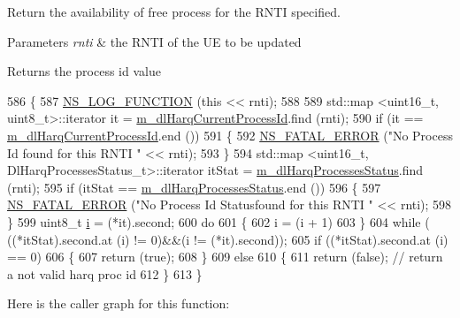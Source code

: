 Return the availability of free process for the R\+N\+TI specified. 


\begin{DoxyParams}{Parameters}
{\em rnti} & the R\+N\+TI of the UE to be updated \\
\hline
\end{DoxyParams}
\begin{DoxyReturn}{Returns}
the process id value 
\end{DoxyReturn}

\begin{DoxyCode}
586 \{
587   \hyperlink{log-macros-disabled_8h_a90b90d5bad1f39cb1b64923ea94c0761}{NS\_LOG\_FUNCTION} (\textcolor{keyword}{this} << rnti);
588 
589   std::map <uint16\_t, uint8\_t>::iterator it = \hyperlink{classns3_1_1TdTbfqFfMacScheduler_ad1c507f0824369e326a2f4594a19f5e9}{m\_dlHarqCurrentProcessId}.find (rnti);
590   \textcolor{keywordflow}{if} (it == \hyperlink{classns3_1_1TdTbfqFfMacScheduler_ad1c507f0824369e326a2f4594a19f5e9}{m\_dlHarqCurrentProcessId}.end ())
591     \{
592       \hyperlink{group__fatal_ga5131d5e3f75d7d4cbfd706ac456fdc85}{NS\_FATAL\_ERROR} (\textcolor{stringliteral}{"No Process Id found for this RNTI "} << rnti);
593     \}
594   std::map <uint16\_t, DlHarqProcessesStatus\_t>::iterator itStat = 
      \hyperlink{classns3_1_1TdTbfqFfMacScheduler_a3d25806fc0b4360d668951f3a6b96b8d}{m\_dlHarqProcessesStatus}.find (rnti);
595   \textcolor{keywordflow}{if} (itStat == \hyperlink{classns3_1_1TdTbfqFfMacScheduler_a3d25806fc0b4360d668951f3a6b96b8d}{m\_dlHarqProcessesStatus}.end ())
596     \{
597       \hyperlink{group__fatal_ga5131d5e3f75d7d4cbfd706ac456fdc85}{NS\_FATAL\_ERROR} (\textcolor{stringliteral}{"No Process Id Statusfound for this RNTI "} << rnti);
598     \}
599   uint8\_t \hyperlink{bernuolliDistribution_8m_a6f6ccfcf58b31cb6412107d9d5281426}{i} = (*it).second;
600   \textcolor{keywordflow}{do}
601     \{
602       i = (i + 1) %
603     \}
604   \textcolor{keywordflow}{while} ( ((*itStat).second.at (i) != 0)&&(i != (*it).second));
605   \textcolor{keywordflow}{if} ((*itStat).second.at (i) == 0)
606     \{
607       \textcolor{keywordflow}{return} (\textcolor{keyword}{true});
608     \}
609   \textcolor{keywordflow}{else}
610     \{
611       \textcolor{keywordflow}{return} (\textcolor{keyword}{false}); \textcolor{comment}{// return a not valid harq proc id}
612     \}
613 \}
\end{DoxyCode}


Here is the caller graph for this function\+:


